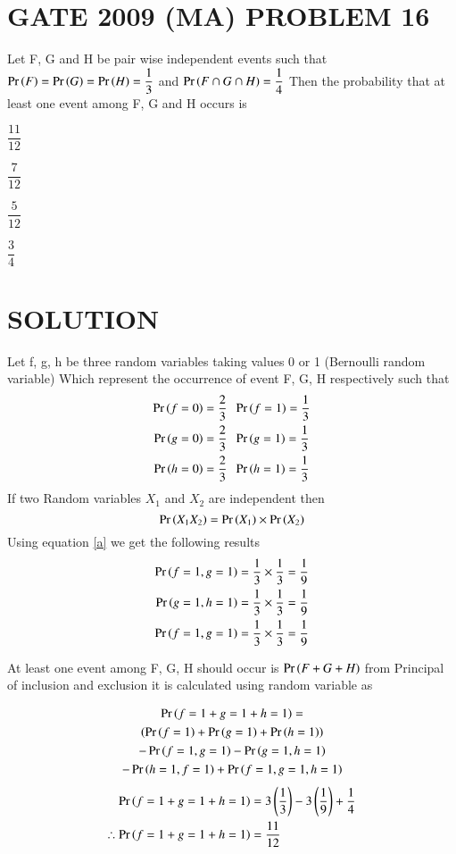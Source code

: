 \documentclass[journal,12pt,twocolumn]{IEEEtran}
\begin{document}
\section{GATE 2009 (MA) PROBLEM 16} 
Let F, G and H be pair wise independent events such that $\Pr\left(F\right)=\Pr\left(G\right)=\Pr\left(H\right)=\dfrac{1}{3}$ 
and $\Pr\left(F \cap G \cap H\right)=\dfrac{1}{4}$ Then the probability that at least one event among F, G and H occurs is 
\begin{enumerate}[(A)]
\begin{multicols}{4}
\setlength\itemsep{2em}
\item $\dfrac{11}{12}$
\item $\dfrac{7}{12}$
\item $\dfrac{5}{12}$
\item $\dfrac{3}{4}$
\end{multicols}
\end{enumerate}

\section{SOLUTION}
Let f, g, h be three random variables taking values 0 or 1 (Bernoulli random variable) Which 
represent the occurrence of event F, G, H respectively such that 
\begin{align*}
\Pr\left(f=0\right) = \dfrac{2}{3}\;&\;\Pr\left(f=1\right) = \dfrac{1}{3} \\
\Pr\left(g=0\right) = \dfrac{2}{3}\;&\;\Pr\left(g=1\right) = \dfrac{1}{3} \\
\Pr\left(h=0\right) = \dfrac{2}{3}\;&\;\Pr\left(h=1\right) = \dfrac{1}{3} \\
\end{align*}
If two Random variables $X_1$ and $X_2$ are independent then 
\begin{equation}
\Pr\left(X_1 X_2\right) = \Pr\left(X_1\right) \times \Pr\left(X_2\right) \label{a}
\end{equation}
Using equation \eqref{a} we get the following results 
\begin{align*}
\Pr\left(f=1,g=1\right) &= \dfrac{1}{3} \times \dfrac{1}{3} = \dfrac{1}{9} \\
\Pr\left(g=1,h=1\right) &= \dfrac{1}{3} \times \dfrac{1}{3} = \dfrac{1}{9} \\
\Pr\left(f=1,g=1\right) &= \dfrac{1}{3} \times \dfrac{1}{3} = \dfrac{1}{9} 
\end{align*}

At least one event among F, G, H should occur is $\Pr\left(F + G + H\right)$ 
from Principal of inclusion and exclusion it is calculated using random variable as

\begin{multline*}
\Pr\left(f=1 + g=1 + h=1\right) =  \\
\left(\Pr\left(f=1\right) + \Pr\left(g=1\right) + \Pr\left(h=1\right)\right) \\
- \Pr\left(f=1,g=1\right) - \Pr\left(g=1,h=1\right) \\
 - \Pr\left(h=1,f=1\right) + \Pr\left(f=1,g=1,h=1\right)
\end{multline*}
\begin{align*}
\Pr\left(f=1 + g=1 + h=1\right) &= 3\left(\dfrac{1}{3}\right) - 3\left(\dfrac{1}{9}\right) + \dfrac{1}{4} \\
\therefore \Pr\left(f=1 + g=1 + h=1\right) &= \dfrac{11}{12}
\end{align*}
\end{document}

